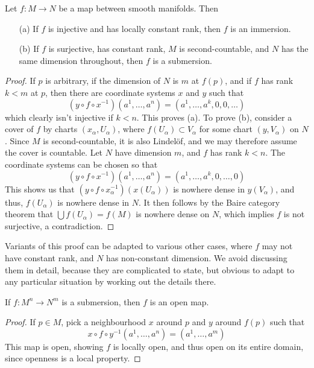 \begin{theorem}
    Let $f: M \to N$ be a map between smooth manifolds. Then
    \begin{enumerate}
        \item[(a)] If $f$ is injective and has locally constant rank, then $f$ is an immersion.
        \item[(b)] If $f$ is surjective, has constant rank, $M$ is second-countable, and $N$ has the same dimension throughout, then $f$ is a submersion.
    \end{enumerate}
\end{theorem}
\begin{proof}
    If $p$ is arbitrary, if the dimension of $N$ is $m$ at $f(p)$, and if $f$ has rank $k < m$ at $p$, then there are coordinate systems $x$ and $y$ such that
    \[ (y \circ f \circ x^{-1})(a^1, \dots, a^n) = (a^1, \dots, a^k, 0, 0, \dots) \]
    which clearly isn't injective if $k < n$. This proves (a). To prove (b), consider a cover of $f$ by charts $(x_\alpha, U_\alpha)$, where $f(U_\alpha) \subset V_\alpha$ for some chart $(y,V_\alpha)$ on $N$. Since $M$ is second-countable, it is also Lindel\"{o}f, and we may therefore assume the cover is countable. Let $N$ have dimension $m$, and $f$ has rank $k < n$. The coordinate systems can be chosen so that
    \[ (y \circ f \circ x^{-1})(a^1, \dots, a^n) = (a^1, \dots, a^k, 0, \dots, 0) \]
    This shows us that $(y \circ f \circ x_\alpha^{-1})(x(U_\alpha))$ is nowhere dense in $y(V_\alpha)$, and thus, $f(U_\alpha)$ is nowhere dense in $N$. It then follows by the Baire category theorem that $\bigcup f(U_\alpha) = f(M)$ is nowhere dense on $N$, which implies $f$ is not surjective, a contradiction.
\end{proof}

Variants of this proof can be adapted to various other cases, where $f$ may not have constant rank, and $N$ has non-constant dimension. We avoid discussing them in detail, because they are complicated to state, but obvious to adapt to any particular situation by working out the details there.

\begin{theorem}
    If $f:M^n \to N^m$ is a submersion, then $f$ is an open map.
\end{theorem}
\begin{proof}
    If $p \in M$, pick a neighbourhood $x$ around $p$ and $y$ around $f(p)$ such that
    \[ x \circ f \circ y^{-1}(a^1, \dots, a^n) = (a^1, \dots, a^m) \]
    This map is open, showing $f$ is locally open, and thus open on its entire domain, since openness is a local property.
\end{proof}

